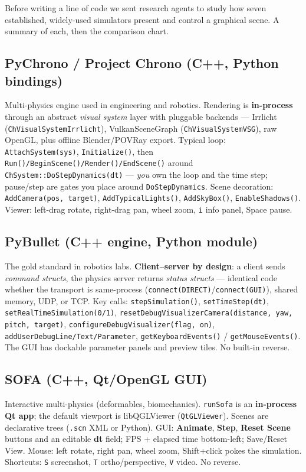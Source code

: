 \documentclass[11pt]{article}
\newcommand{\code}[1]{\texttt{#1}}
\begin{document}
Before writing a line of code we sent research agents to study how
seven established, widely-used simulators present and control a
graphical scene. A summary of each, then the comparison chart.

\subsection{PyChrono / Project Chrono (C++, Python bindings)}

Multi-physics engine used in engineering and robotics. Rendering is
\textbf{in-process} through an abstract \emph{visual system} layer
with pluggable backends --- Irrlicht
(\code{ChVisualSystemIrrlicht}), VulkanSceneGraph
(\code{ChVisualSystemVSG}), raw OpenGL, plus offline Blender/POVRay
export. Typical loop: \code{AttachSystem(sys)}, \code{Initialize()},
then \code{Run()/BeginScene()/Render()/EndScene()} around
\code{ChSystem::DoStepDynamics(dt)} --- \emph{you} own the loop and
the time step; pause/step are gates you place around
\code{DoStepDynamics}. Scene decoration: \code{AddCamera(pos,
target)}, \code{AddTypicalLights()}, \code{AddSkyBox()},
\code{EnableShadows()}. Viewer: left-drag rotate, right-drag pan,
wheel zoom, \code{i} info panel, Space pause.

\subsection{PyBullet (C++ engine, Python module)}

The gold standard in robotics labs. \textbf{Client--server by
design}: a client sends \emph{command structs}, the physics server
returns \emph{status structs} --- identical code whether the transport
is same-process (\code{connect(DIRECT)}/\code{connect(GUI)}), shared
memory, UDP, or TCP. Key calls: \code{stepSimulation()},
\code{setTimeStep(dt)}, \code{setRealTimeSimulation(0/1)},
\code{resetDebugVisualizerCamera(distance, yaw, pitch, target)},
\code{configureDebugVisualizer(flag, on)},
\code{addUserDebugLine/Text/Parameter},
\code{getKeyboardEvents()} / \code{getMouseEvents()}. The GUI has
dockable parameter panels and preview tiles. No built-in reverse.

\subsection{SOFA (C++, Qt/OpenGL GUI)}

Interactive multi-physics (deformables, biomechanics). \code{runSofa}
is an \textbf{in-process Qt app}; the default viewport is
libQGLViewer (\code{QtGLViewer}). Scenes are declarative trees
(\code{.scn} XML or Python). GUI: \textbf{Animate}, \textbf{Step},
\textbf{Reset Scene} buttons and an editable \textbf{dt} field; FPS +
elapsed time bottom-left; Save/Reset View. Mouse: left rotate, right
pan, wheel zoom, Shift+click pokes the simulation. Shortcuts:
\code{S} screenshot, \code{T} ortho/perspective, \code{V} video. No
reverse.
\end{document}
